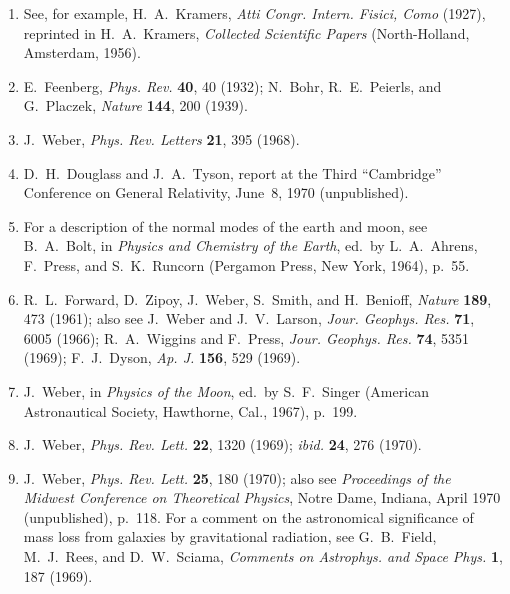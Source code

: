 \begin{enumerate}
  \item {}\label{ch10-ref-10}
  See, for example, H.~A.~Kramers, \emph{Atti Congr. Intern. Fisici, Como}
  (1927), reprinted in H.~A.~Kramers, \emph{Collected Scientific Papers}
  (North-Holland, Amsterdam, 1956).

  \item {}\label{ch10-ref-11}
  E.~Feenberg, \emph{Phys. Rev.} \textbf{40}, 40 (1932);
  N.~Bohr, R.~E.~Peierls, and G.~Placzek, \emph{Nature} \textbf{144},
  200 (1939).

  \item {}\label{ch10-ref-12}
  J.~Weber, \emph{Phys. Rev. Letters} \textbf{21}, 395 (1968).

  \item {}\label{ch10-ref-13}
  D.~H.~Douglass and J.~A.~Tyson, report at the Third ``Cambridge''
  Conference on General Relativity, June~8, 1970 (unpublished).

  \item {}\label{ch10-ref-14}
  For a description of the normal modes of the earth and moon, see
  B.~A.~Bolt, in \emph{Physics and Chemistry of the Earth}, ed.\ by
  L.~A.~Ahrens, F.~Press, and S.~K.~Runcorn (Pergamon Press, New York,
  1964), p.~55.

  \item {}\label{ch10-ref-15}
  R.~L.~Forward, D.~Zipoy, J.~Weber, S.~Smith, and H.~Benioff,
  \emph{Nature} \textbf{189}, 473 (1961); also see J.~Weber and
  J.~V.~Larson, \emph{Jour. Geophys. Res.} \textbf{71}, 6005 (1966);
  R.~A.~Wiggins and F.~Press, \emph{Jour. Geophys. Res.} \textbf{74},
  5351 (1969); F.~J.~Dyson, \emph{Ap. J.} \textbf{156}, 529 (1969).

  \item {}\label{ch10-ref-16}
  J.~Weber, in \emph{Physics of the Moon}, ed.\ by S.~F.~Singer (American
  Astronautical Society, Hawthorne, Cal., 1967), p.~199.

  \item {}\label{ch10-ref-17}
  J.~Weber, \emph{Phys. Rev. Lett.} \textbf{22}, 1320 (1969);
  \emph{ibid.} \textbf{24}, 276 (1970).

  \item {}\label{ch10-ref-18}
  J.~Weber, \emph{Phys. Rev. Lett.} \textbf{25}, 180 (1970); also see
  \emph{Proceedings of the Midwest Conference on Theoretical Physics},
  Notre Dame, Indiana, April 1970 (unpublished), p.~118. For a comment on
  the astronomical significance of mass loss from galaxies by gravitational
  radiation, see G.~B.~Field, M.~J.~Rees, and D.~W.~Sciama,
  \emph{Comments on Astrophys. and Space Phys.} \textbf{1}, 187 (1969).


\end{enumerate}
